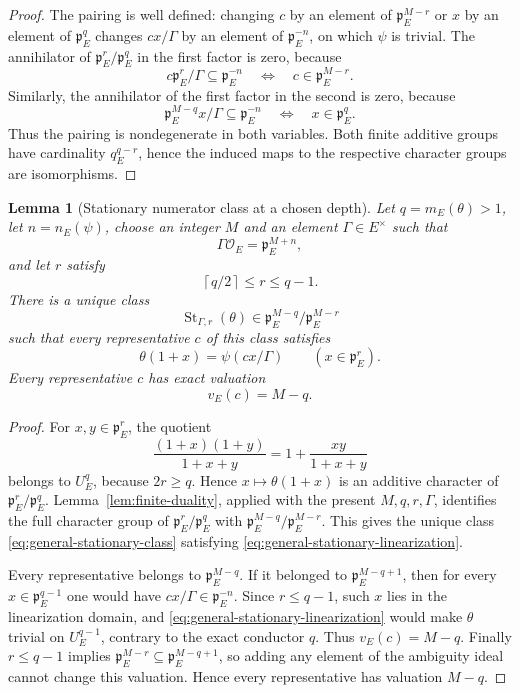 \documentclass[11pt]{amsart}
\newtheorem{lemma}[theorem]{Lemma}
\theoremstyle{definition}
\theoremstyle{remark}
\newcommand{\cO}{\mathcal O}
\newcommand{\p}{\mathfrak p}
\newcommand{\ceil}[1]{\left\lceil #1\right\rceil}
\begin{document}
\begin{proof}
The pairing is well defined: changing $c$ by an element of
$\p_E^{M-r}$ or $x$ by an element of $\p_E^q$ changes $cx/\Gamma$ by
an element of $\p_E^{-n}$, on which $\psi$ is trivial.  The annihilator
of $\p_E^r/\p_E^q$ in the first factor is zero, because
\[
 c\p_E^r/\Gamma\subseteq\p_E^{-n}
 \quad\Longleftrightarrow\quad
 c\in\p_E^{M-r}.
\]
Similarly, the annihilator of the first factor in the second is zero,
because
\[
 \p_E^{M-q}x/\Gamma\subseteq\p_E^{-n}
 \quad\Longleftrightarrow\quad
 x\in\p_E^q.
\]
Thus the pairing is nondegenerate in both variables.  Both finite
additive groups have cardinality $q_E^{q-r}$, hence the induced maps to
the respective character groups are isomorphisms.
\end{proof}

\begin{lemma}[Stationary numerator class at a chosen depth]
\label{lem:stationary-class-existence}
Let $q=m_E(\theta)>1$, let $n=n_E(\psi)$, choose an integer $M$ and
an element $\Gamma\in E^\times$ such that
\[
 \Gamma\cO_E=\p_E^{M+n},
\]
and let $r$ satisfy
\[
 \ceil{q/2}\le r\le q-1.
\]
There is a unique class
\begin{equation}\label{eq:general-stationary-class}
 \operatorname{St}_{\Gamma,r}(\theta)
 \in \p_E^{M-q}/\p_E^{M-r}
\end{equation}
such that every representative $c$ of this class satisfies
\begin{equation}\label{eq:general-stationary-linearization}
 \theta(1+x)=\psi(cx/\Gamma)
 \qquad(x\in\p_E^r).
\end{equation}
Every representative $c$ has exact valuation
\begin{equation}\label{eq:general-stationary-valuation}
 v_E(c)=M-q.
\end{equation}
\end{lemma}

\begin{proof}
For $x,y\in\p_E^r$, the quotient
\[
 \frac{(1+x)(1+y)}{1+x+y}
 =1+\frac{xy}{1+x+y}
\]
belongs to $U_E^q$, because $2r\ge q$.  Hence
$x\mapsto\theta(1+x)$ is an additive character of
$\p_E^r/\p_E^q$.  Lemma~\ref{lem:finite-duality}, applied with the
present $M,q,r,\Gamma$, identifies the full character group of
$\p_E^r/\p_E^q$ with
$\p_E^{M-q}/\p_E^{M-r}$.  This gives the unique class
\eqref{eq:general-stationary-class} satisfying
\eqref{eq:general-stationary-linearization}.

Every representative belongs to $\p_E^{M-q}$.  If it belonged to
$\p_E^{M-q+1}$, then for every $x\in\p_E^{q-1}$ one would have
$cx/\Gamma\in\p_E^{-n}$.  Since $r\le q-1$, such $x$ lies in the
linearization domain, and
\eqref{eq:general-stationary-linearization} would make $\theta$ trivial
on $U_E^{q-1}$, contrary to the exact conductor $q$.  Thus
$v_E(c)=M-q$.  Finally $r\le q-1$ implies
$\p_E^{M-r}\subseteq\p_E^{M-q+1}$, so adding any element of the
ambiguity ideal cannot change this valuation.  Hence every
representative has valuation $M-q$.
\end{proof}
\end{document}
